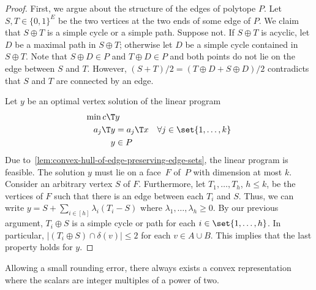 \begin{proof}
    First, we argue about the structure of the edges of polytope $P$.
    Let $S, T\in \{0,1\}^E$ be the two vertices at the two ends of
    some edge of $P$. We claim that $S\oplus T$ is a simple cycle
    or a simple path. Suppose not. If $S\oplus T$ is acyclic, let $D$
    be a maximal path in $S\oplus T$; otherwise let $D$ be a simple cycle
    contained in $S\oplus T$.
    Note that $S \oplus D \in P$ and $T \oplus D\in P$ and both
    points do not lie on the edge between $S$ and $T$.
    However, $(S + T)/2 = (T \oplus D + S \oplus D) / 2$ contradicts
    that $S$ and $T$ are connected by an edge.

    Let $y$ be an optimal vertex solution of the linear program
    \begin{align*}
        \min c\T& y \\
        a_j\T y &= a_j\T x &\forall j \in \set{1,\dotsc,k} \\
        y &\in P
    \end{align*}
    Due to~\cref{lem:convex-hull-of-edge-preserving-edge-sets}, the linear program is feasible.
    The solution $y$ must lie on a face~$F$ of~$P$ with dimension at most $k$.
    Consider an arbitrary vertex $S$ of $F$. Furthermore, let $T_1,\dotsc,T_h$, $h\le k$, be the vertices of $F$ such that there is an edge between each $T_i$ and $S$.
    Thus, we can write $y = S + \sum_{i \in [h]} \lambda_i (T_i - S)$ where $\lambda_1,\dotsc,\lambda_h \ge 0$.
    By our previous argument, $T_i \oplus S$ is a simple cycle or path for each $i\in \set{1,\dotsc,h}$.
    In particular, $|(T_i \oplus S) \cap \delta(v)| \le 2$ for each $v\in A\cup B$. This implies that the last property holds for $y$.
\end{proof}

Allowing a small rounding error, there always exists a convex representation where the scalars are integer multiples of a power of two.

\ScalarRounding*

